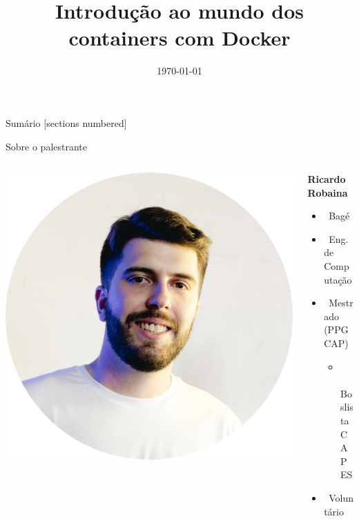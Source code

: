 \documentclass[aspectratio=1610]{beamer}}
\title{Introdução ao mundo dos containers com Docker}
\date{\today}
\begin{document}
	
	\begin{frame}{}
		\titlepage
		\thispagestyle{empty}
	\end{frame}
	
	\begin{frame}{Sumário}
		[sections numbered]
		\tableofcontents[hideallsubsections]
	\end{frame}

	\begin{frame}{Sobre o palestrante}
	
		\begin{columns}
			\begin{column}{0.5\textwidth}
				\includegraphics[scale = 0.17]{fig/fig_eu.png}
			\end{column}
			\begin{column}{0.5\textwidth}  %
				\textbf{Ricardo Robaina}
				\begin{itemize}
					\item \faMapMarker \ Bagé
					\item \faMortarBoard \ Eng. de Computação
					\item \faMortarBoard \ Mestrado (PPGCAP)
						\begin{itemize}
							\item \small{\\\\Boslista CAPES}
						\end{itemize}
					\item \faLinux \ Voluntário
				\end{itemize}
			\end{column}
		\end{columns}
	

\end{frame}
\end{document}
